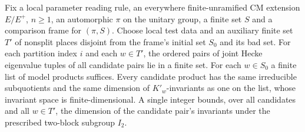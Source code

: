 
\begin{formalstatement}\label{sub:W16}
Fix a local parameter reading rule, an everywhere finite-unramified CM
extension $E/E^+$, $n\ge1$, an automorphic $\pi$ on the unitary group,
a finite set $S$ and a comparison frame for $(\pi,S)$. Choose local test
data and an auxiliary finite set $T'$ of nonsplit places disjoint from
the frame's initial set $S_0$ and its bad set. For each partition
index $i$ and each $w\in T'$, the ordered pairs of joint Hecke
eigenvalue tuples of all candidate pairs lie in a finite set. For
each $w\in S_0$ a finite list of model products suffices. Every candidate
product has the same irreducible subquotients and the same dimension
of $K'_w$-invariants as one on the list, whose invariant space is
finite-dimensional. A single integer bounds, over all candidates and
all $w\in T'$, the dimension of the candidate pair's invariants under
the prescribed two-block subgroup $I_2$.
\end{formalstatement}
